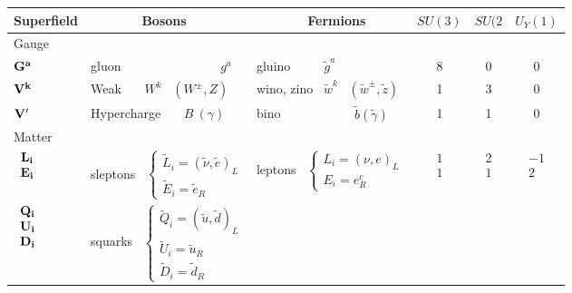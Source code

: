\documentclass{cernyrep}
\begin{document}
\begin{table}[htb]
\begin{center}
\renewcommand{\tabcolsep}{0.03cm}
\begin{tabular}{|lllccc|}\hline
Superfield & \ \ \ \ \ \ \ Bosons & \ \ \ \ \ \ \ Fermions &
$SU(3)$& $SU(2$ & $U_Y(1)$ \\
\hline \hline
Gauge  &&&&& \\
${\bf G^a}$   & gluon \ \ \ \ \ \ \ \ \ \ \ \ \ \ \  $g^a$ &
gluino$ \ \ \ \ \ \ \ \ \ \ \ \ \tilde{g}^a$ & 8 & 0 & 0 \\
${\bf V^k}$ & Weak \ \ \ $W^k$ \ $(W^\pm, Z)$ & wino, zino \
$\tilde{w}^k$ \ $(\tilde{w}^\pm, \tilde{z})$ & 1 & 3& 0 \\
${\bf V'}$   & Hypercharge  \ \ \ $B\ (\gamma)$ & bino
\ \ \ \ \ \ \ \ \ \ \ $\tilde{b}(\tilde{\gamma})$ & 1 & 1& 0 \\
\hline \hline
Matter &&&&& \\
$\begin{array}{c}
{\bf L_i} \\ {\bf E_i}
\end{array}$ & sleptons
\ $\left\{
\begin{array}{l}
\tilde{L}_i=(\tilde{\nu},\tilde e)_L \\
\tilde{E}_i =\tilde e_R
\end{array} \right. $
& leptons \ $\left\{
\begin{array}{l}
L_i=(\nu,e)_L \\
E_i=e_R^c
\end{array} \right.$
& $\begin{array}{l}
1 \\ 1
\end{array} $
& $\begin{array}{l}
2 \\ 1
\end{array} $ & $
\begin{array}{r} -1 \\ 2
\end{array} $ \\
$\begin{array}{c} {\bf Q_i} \\ {\bf U_i} \\ {\bf D_i}
\end{array}$
& squarks \ $\left\{
\begin{array}{l}
\tilde{Q}_i=(\tilde{u},\tilde d)_L \\ \tilde{U}_i =\tilde u_R \\
\tilde{D}_i =\tilde d_R
\end{array}  \right. $

\end{tabular}
\end{center}
\end{table}
\end{document}
